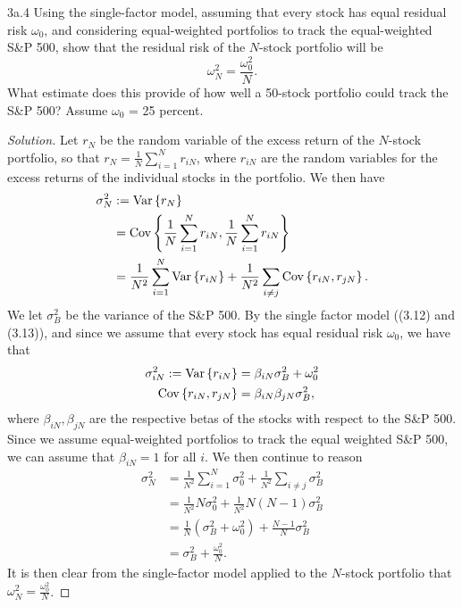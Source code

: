 \begin{problem}{3a.4}
Using the single-factor model, assuming that every stock has equal residual risk $\omega_{0}$, and considering equal-weighted portfolios to track the equal-weighted S\&P 500, show that the residual risk of the $N$-stock portfolio will be \[\omega_{N}^{2} = \frac{\omega_{0}^{2}}{N}.\] What estimate does this provide of how well a 50-stock portfolio could track the S\&P 500? Assume
$\omega_{0}$ = 25 percent.
\end{problem}

\begin{proof}[Solution]
Let $r_{N}$ be the random variable of the excess return of the $N$-stock portfolio, so that $r_{N} = \frac{1}{N}\sum_{i = 1}^{N}r_{iN}$, where $r_{iN}$ are the random variables for the excess returns of the individual stocks in the portfolio. We then have
\begin{align*}
\sigma_{N}^{2} &:= \mathrm{Var}\left\lbrace r_{N}\right\rbrace\\
&= \mathrm{Cov}\left\lbrace\frac{1}{N}\sum_{i=1}^{N}r_{iN}, \frac{1}{N}\sum_{i=1}^{N}r_{iN}\right\rbrace\\
&= \frac{1}{N^{2}}\sum_{i=1}^{N}\mathrm{Var}\left\lbrace r_{iN}\right\rbrace + \frac{1}{N^{2}}\sum_{i \neq j}\mathrm{Cov}\left\lbrace r_{iN}, r_{jN}\right\rbrace.
\end{align*}
We let $\sigma_{B}^{2}$ be the variance of the S\&P 500. By the single factor model ((3.12) and (3.13)), and since we assume that every stock has equal residual risk $\omega_{0}$, we have that
\begin{align*}
\sigma_{iN}^{2} := \mathrm{Var}\left\lbrace r_{iN}\right\rbrace &= \beta_{iN}\sigma_{B}^{2} + \omega_{0}^{2} \\
\mathrm{Cov}\left\lbrace r_{iN},r_{jN}\right\rbrace &= \beta_{iN}\beta_{jN}\sigma_{B}^{2},
\end{align*}
where $\beta_{iN}, \beta_{jN}$ are the respective betas of the stocks with respect to the S\&P 500. Since we assume equal-weighted portfolios to track the equal weighted S\&P 500, we can assume that $\beta_{iN} = 1$ for all $i$. We then continue to reason
\begin{align*}
\sigma_{N}^{2} &= \frac{1}{N^{2}}\sum_{i=1}^{N}\sigma_{0}^{2} + \frac{1}{N^2}\sum_{i \neq j}\sigma_{B}^{2}\\
&= \frac{1}{N^{2}}N\sigma_{0}^{2} + \frac{1}{N^{2}}N(N-1)\sigma_{B}^{2}\\
&= \frac{1}{N}(\sigma_{B}^{2} + \omega_{0}^{2}) + \frac{N - 1}{N}\sigma_{B}^{2}\\
&= \sigma_{B}^{2} + \frac{\omega_{0}^{2}}{N}.
\end{align*} 
It is then clear from the single-factor model applied to the $N$-stock portfolio that $\omega_{N}^{2} = \frac{\omega_{0}^{2}}{N}$.


\end{proof}
